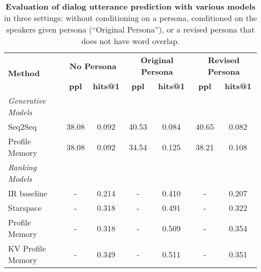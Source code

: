 \begin{table*}[t]
  \centering
  \begin{tabular}{lcccccc}
  \toprule
  \multirow{2}{*}{\textbf{Method}} & \multicolumn{2}{c}{\textbf{No Persona}} & \multicolumn{2}{c}{\textbf{Original Persona}} & \multicolumn{2}{c}{\textbf{Revised Persona}}\\
   & \textbf{ppl} & \textbf{hits@1} & \textbf{ppl} & \textbf{hits@1}  &\textbf{ppl} & \textbf{hits@1} 
   \\
  \midrule
  {\em Generative Models} \\
  Seq2Seq        & 38.08 & 0.092 & 40.53 & 0.084 &  40.65 & 0.082 \\
  Profile Memory & 38.08 & 0.092 & 34.54 & 0.125 & 38.21 & 0.108 \\
  \midrule
  {\em Ranking Models} \\
    IR baseline        & - & 0.214 &  - & 0.410  & - &  0.207  \\
  Starspace          & - & 0.318 &   - & 0.491  & - & 0.322   \\
 Profile Memory    & - & 0.318  &  - & 0.509  &  - & 0.354  \\
 KV Profile Memory & - & 0.349  &  - & 0.511  &  - & 0.351   \\
  \bottomrule
  \end{tabular}
  \caption{{\bf Evaluation of dialog utterance prediction with various models} in three settings: without conditioning on a persona, conditioned on the speakers given persona (``Original Persona''),  or a revised persona that does not have word overlap.      \label{tab:all-results}
     }
\end{table*}


